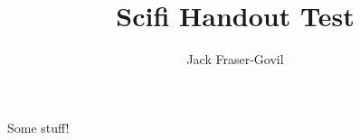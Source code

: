 \documentclass[theme=scifi]{rpghandout}
\title{Scifi Handout Test}
\author{Jack Fraser-Govil}
\begin{document}
    \maketitle{}

    Some stuff!
\end{document}
